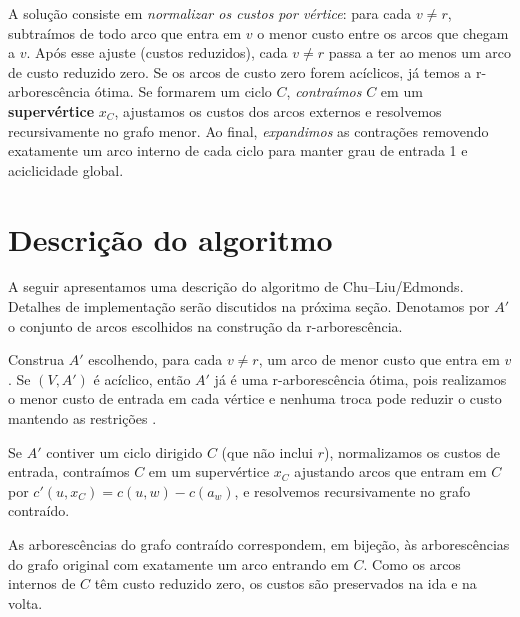 A solução consiste em \emph{normalizar os custos por vértice}: para cada \(v\neq r\), subtraímos de todo arco que entra em \(v\) o menor custo entre os arcos que chegam a \(v\). Após esse ajuste (custos reduzidos), cada \(v\neq r\) passa a ter ao menos um arco de custo reduzido zero. Se os arcos de custo zero forem acíclicos, já temos a r-arborescência ótima. Se formarem um ciclo \(C\), \emph{contraímos} \(C\) em um \textbf{supervértice} \(x_C\), ajustamos os custos dos arcos externos e resolvemos recursivamente no grafo menor. Ao final, \emph{expandimos} as contrações removendo exatamente um arco interno de cada ciclo para manter grau de entrada 1 e aciclicidade global.



\section{Descrição do algoritmo}
A seguir apresentamos uma descrição do algoritmo de Chu–Liu/Edmonds. Detalhes de implementação serão discutidos na próxima seção. Denotamos por \(A'\) o conjunto de arcos escolhidos na construção da r-arborescência.

Construa \(A'\) escolhendo, para cada \(v\neq r\), um arco de menor custo que entra em \(v\). Se \((V,A')\) é acíclico, então \(A'\) já é uma r-arborescência ótima, pois realizamos o menor custo de entrada em cada vértice e nenhuma troca pode reduzir o custo mantendo as restrições \cite[Sec.~4.9]{kleinberg2006}.

Se \(A'\) contiver um ciclo dirigido \(C\) (que não inclui \(r\)), normalizamos os custos de entrada, contraímos \(C\) em um supervértice \(x_C\) ajustando arcos que entram em \(C\) por \(c'(u,x_C)=c(u,w)-c(a_w)\), e resolvemos recursivamente no grafo contraído.

As arborescências do grafo contraído correspondem, em bijeção, às arborescências do grafo original com exatamente um arco entrando em \(C\). Como os arcos internos de \(C\) têm custo reduzido zero, os custos são preservados na ida e na volta.

